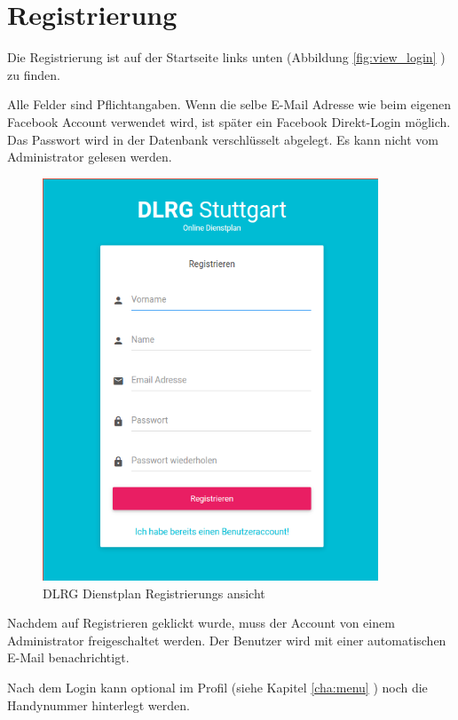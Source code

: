 \chapter{Registrierung}
\label{cha:register}

Die Registrierung ist auf der Startseite links unten (Abbildung  \ref{fig:view_login} \textit{}) zu finden.

\vspace*{5mm} \noindent Alle Felder sind Pflichtangaben. Wenn die selbe E-Mail Adresse wie beim eigenen Facebook Account verwendet wird, ist später ein Facebook Direkt-Login möglich. Das Passwort wird in der Datenbank verschlüsselt abgelegt. Es kann nicht vom Administrator gelesen werden.

\begin{figure}[h]
 \begin{addmargin}{-0.2\linewidth}
   \centering 
   \includegraphics[width=10cm]{Bilder/view_register.png}
 \end{addmargin} 
 \caption[DLRG Dienstplan Registrierungs ansicht]{DLRG Dienstplan Registrierungs ansicht}
 \label{fig:view_register}
\end{figure}

\vspace*{5mm} \noindent 
Nachdem auf Registrieren geklickt wurde, muss der Account von einem Administrator freigeschaltet werden. Der Benutzer wird mit einer automatischen E-Mail benachrichtigt. 

\noindent Nach dem Login kann optional im Profil (siehe Kapitel \ref{cha:menu} \textit{}) noch die Handynummer hinterlegt werden.